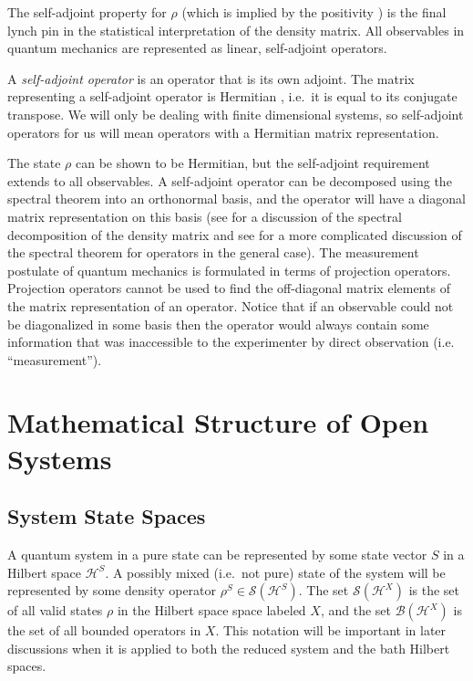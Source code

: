 The self-adjoint property for $\rho$ (which is implied by the positivity \cite{Eidelman2004}) is the final lynch pin in the statistical interpretation of the density matrix.  All observables in quantum mechanics are represented as linear, self-adjoint operators.  
\begin{definition}
A {\em self-adjoint operator} is an operator that is its own adjoint.  The matrix representing a self-adjoint operator is Hermitian \cite{Byron1992}, i.e.\ it is equal to its conjugate transpose.  We will only be dealing with finite dimensional systems, so self-adjoint operators for us will mean operators with a Hermitian matrix representation.
\end{definition}

The state $\rho$ can be shown to be Hermitian, but the self-adjoint requirement extends to all observables.  A self-adjoint operator can be decomposed using the spectral theorem into an orthonormal basis, and the operator will have a diagonal matrix representation on this basis (see \cite{Nielsen2010} for a discussion of the spectral decomposition of the density matrix and see \cite{Breuer2007} for a more complicated discussion of the spectral theorem for operators in the general case).  The measurement postulate of quantum mechanics is formulated in terms of projection operators.  Projection operators cannot be used to find the off-diagonal matrix elements of the matrix representation of an operator.  Notice that if an observable could not be diagonalized in some basis then the operator would always contain some information that was inaccessible to the experimenter by direct observation (i.e. ``measurement'').

\section{Mathematical Structure of Open Systems}

\subsection{System State Spaces}
A quantum system in a pure state can be represented by some state vector $S$ in a Hilbert space $\mathcal{H}^S$.  A possibly mixed (i.e.\ not pure) state of the system will be represented by some density operator $\rho^S\in \mathcal{S}(\mathcal{H}^S)$.  The set $\mathcal{S}(\mathcal{H}^X)$ is the set of all valid states $\rho$ in the Hilbert space space labeled $X$, and the set $\mathcal{B}(\mathcal{H}^X)$ is the set of all bounded operators in $X$.  This notation will be important in later discussions when it is applied to both the reduced system and the bath Hilbert spaces.


